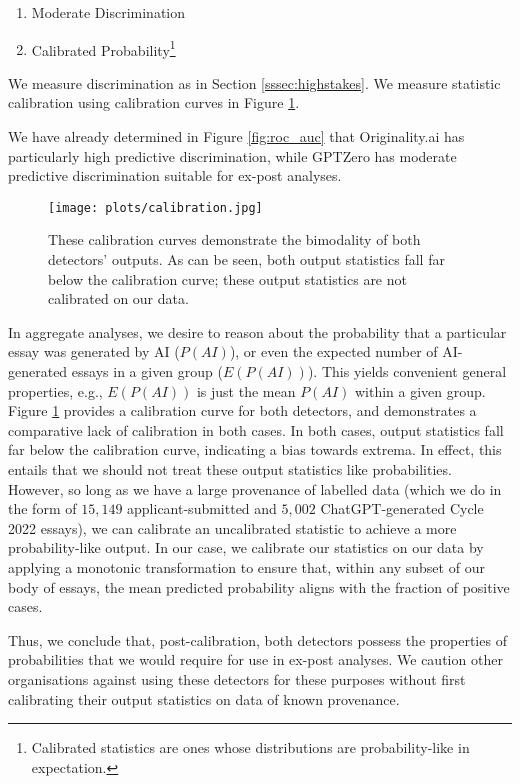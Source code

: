 \begin{enumerate}
    \item Moderate Discrimination
    \item Calibrated Probability\footnote{Calibrated statistics are ones whose distributions are probability-like in expectation.}
\end{enumerate}

We measure discrimination as in Section \ref{sssec:highstakes}. We measure statistic calibration using calibration curves in Figure \ref{fig:calibration}.

We have already determined in Figure \ref{fig:roc_auc} that Originality.ai has particularly high predictive discrimination, while GPTZero has moderate predictive discrimination suitable for ex-post analyses.

\begin{figure}[htb]
  \centering
  \texttt{[image: plots/calibration.jpg]}
  \caption{These calibration curves demonstrate the bimodality of both detectors' outputs. As can be seen, both output statistics fall far below the calibration curve; these output statistics are not calibrated on our data.}
  \label{fig:calibration}
\end{figure}

In aggregate analyses, we desire to reason about the probability that a particular essay was generated by AI ($P(AI)$), or even the expected number of AI-generated essays in a given group ($E(P(AI))$). This yields convenient general properties, e.g., $E(P(AI))$ is just the mean $P(AI)$ within a given group. Figure \ref{fig:calibration} provides a calibration curve for both detectors, and demonstrates a comparative lack of calibration in both cases. In both cases, output statistics fall far below the calibration curve, indicating a bias towards extrema. In effect, this entails that we should not treat these output statistics like probabilities. However, so long as we have a large provenance of labelled data (which we do in the form of $15,149$ applicant-submitted and $5,002$ ChatGPT-generated Cycle 2022 essays), we can calibrate an uncalibrated statistic to achieve a more probability-like output. In our case, we calibrate our statistics on our data by applying a monotonic transformation to ensure that, within any subset of our body of essays, the mean predicted probability aligns with the fraction of positive cases.

Thus, we conclude that, post-calibration, both detectors possess the properties of probabilities that we would require for use in ex-post analyses. We caution other organisations against using these detectors for these purposes without first calibrating their output statistics on data of known provenance.

